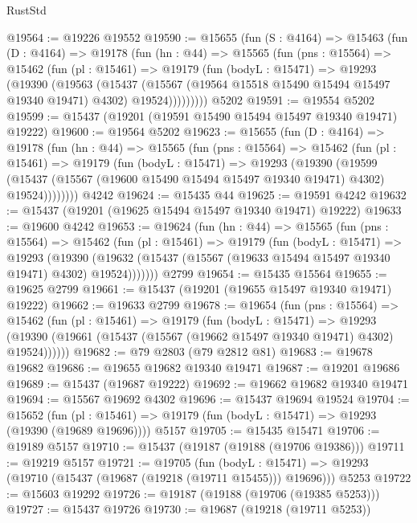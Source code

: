 \begin{lexlean}{RustStd}
\begin{coremodule}
@19564 := @19226 @19552
@19590 := @15655
    (fun (S : @4164) =>
    @15463
      (fun (D : @4164) =>
      @19178
        (fun (hn : @44) =>
        @15565
          (fun (pns : @15564) =>
          @15462
            (fun (pl : @15461) =>
            @19179
              (fun (bodyL : @15471) =>
              @19293
                (@19390
                  (@19563
                    (@15437
                      (@15567 (@19564 @15518 @15490 @15494 @15497 @19340 @19471) @4302)
                      @19524)))))))))
    @5202
@19591 := @19554 @5202
@19599 := @15437 (@19201 (@19591 @15490 @15494 @15497 @19340 @19471) @19222)
@19600 := @19564 @5202
@19623 := @15655
    (fun (D : @4164) =>
    @19178
      (fun (hn : @44) =>
      @15565
        (fun (pns : @15564) =>
        @15462
          (fun (pl : @15461) =>
          @19179
            (fun (bodyL : @15471) =>
            @19293
              (@19390
                (@19599
                  (@15437 (@15567 (@19600 @15490 @15494 @15497 @19340 @19471) @4302) @19524))))))))
    @4242
@19624 := @15435 @44
@19625 := @19591 @4242
@19632 := @15437 (@19201 (@19625 @15494 @15497 @19340 @19471) @19222)
@19633 := @19600 @4242
@19653 := @19624
    (fun (hn : @44) =>
    @15565
      (fun (pns : @15564) =>
      @15462
        (fun (pl : @15461) =>
        @19179
          (fun (bodyL : @15471) =>
          @19293
            (@19390
              (@19632 (@15437 (@15567 (@19633 @15494 @15497 @19340 @19471) @4302) @19524)))))))
    @2799
@19654 := @15435 @15564
@19655 := @19625 @2799
@19661 := @15437 (@19201 (@19655 @15497 @19340 @19471) @19222)
@19662 := @19633 @2799
@19678 := @19654
    (fun (pns : @15564) =>
    @15462
      (fun (pl : @15461) =>
      @19179
        (fun (bodyL : @15471) =>
        @19293 (@19390 (@19661 (@15437 (@15567 (@19662 @15497 @19340 @19471) @4302) @19524))))))
@19682 := @79 @2803 (@79 @2812 @81)
@19683 := @19678 @19682
@19686 := @19655 @19682 @19340 @19471
@19687 := @19201 @19686
@19689 := @15437 (@19687 @19222)
@19692 := @19662 @19682 @19340 @19471
@19694 := @15567 @19692 @4302
@19696 := @15437 @19694 @19524
@19704 := @15652
    (fun (pl : @15461) => @19179 (fun (bodyL : @15471) => @19293 (@19390 (@19689 @19696))))
    @5157
@19705 := @15435 @15471
@19706 := @19189 @5157
@19710 := @15437 (@19187 (@19188 (@19706 @19386)))
@19711 := @19219 @5157
@19721 := @19705
    (fun (bodyL : @15471) => @19293 (@19710 (@15437 (@19687 (@19218 (@19711 @15455))) @19696)))
    @5253
@19722 := @15603 @19292
@19726 := @19187 (@19188 (@19706 (@19385 @5253)))
@19727 := @15437 @19726
@19730 := @19687 (@19218 (@19711 @5253))

\end{coremodule}
\end{lexlean}
